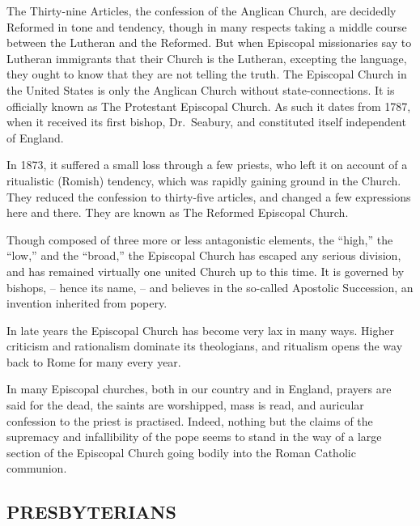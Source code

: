 \documentclass[
]{book}
\begin{document}
The Thirty-nine Articles, the confession of the Anglican Church, are decidedly Reformed in tone and tendency, though in many respects taking a middle course between the Lutheran and the Reformed. But when Episcopal missionaries say to Lutheran immigrants that their Church is the Lutheran, excepting the language, they ought to know that they are not telling the truth. The Episcopal Church in the United States is only the Anglican Church without state-connections. It is officially known as The Protestant Episcopal Church. As such it dates from 1787, when it received its first bishop, Dr.~Seabury, and constituted itself independent of England.

In 1873, it suffered a small loss through a few priests, who left it on account of a ritualistic (Romish) tendency, which was rapidly gaining ground in the Church. They reduced the confession to thirty-five articles, and changed a few expressions here and there. They are known as The Reformed Episcopal Church.

Though composed of three more or less antagonistic elements, the ``high,'' the ``low,'' and the ``broad,'' the Episcopal Church has escaped any serious division, and has remained virtually one united Church up to this time. It is governed by bishops, -- hence its name, -- and believes in the so-called Apostolic Succession, an invention inherited from popery.

In late years the Episcopal Church has become very lax in many ways. Higher criticism and rationalism dominate its theologians, and ritualism opens the way back to Rome for many every year.

In many Episcopal churches, both in our country and in England, prayers are said for the dead, the saints are worshipped, mass is read, and auricular confession to the priest is practised. Indeed, nothing but the claims of the supremacy and infallibility of the pope seems to stand in the way of a large section of the Episcopal Church going bodily into the Roman Catholic communion.

\subsection{PRESBYTERIANS}\label{presbyterians}
\end{document}

